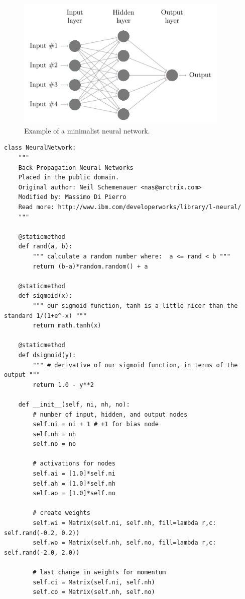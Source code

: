 \documentclass[justified,sixbynine]{tufte-book}
\def\ft{\small\tt}
\theoremstyle{plain}%
\theoremstyle{definition}
\theoremstyle{remark}
\begin{document}
\begin{fullwidth}
\begin{figure}[ht]
\centering\includegraphics[width=4in]{images/neural.png}
\caption{Example of a minimalist neural network.}
\end{figure}


\begin{lstlisting}[caption={in file: {\ft nlib.py}}]
class NeuralNetwork:
    """
    Back-Propagation Neural Networks
    Placed in the public domain.
    Original author: Neil Schemenauer <nas@arctrix.com>
    Modified by: Massimo Di Pierro
    Read more: http://www.ibm.com/developerworks/library/l-neural/
    """

    @staticmethod
    def rand(a, b):
        """ calculate a random number where:  a <= rand < b """
        return (b-a)*random.random() + a

    @staticmethod
    def sigmoid(x):
        """ our sigmoid function, tanh is a little nicer than the standard 1/(1+e^-x) """
        return math.tanh(x)

    @staticmethod
    def dsigmoid(y):
        """ # derivative of our sigmoid function, in terms of the output """
        return 1.0 - y**2

    def __init__(self, ni, nh, no):
        # number of input, hidden, and output nodes
        self.ni = ni + 1 # +1 for bias node
        self.nh = nh
        self.no = no

        # activations for nodes
        self.ai = [1.0]*self.ni
        self.ah = [1.0]*self.nh
        self.ao = [1.0]*self.no

        # create weights
        self.wi = Matrix(self.ni, self.nh, fill=lambda r,c: self.rand(-0.2, 0.2))
        self.wo = Matrix(self.nh, self.no, fill=lambda r,c: self.rand(-2.0, 2.0))

        # last change in weights for momentum
        self.ci = Matrix(self.ni, self.nh)
        self.co = Matrix(self.nh, self.no)


\end{lstlisting}
\end{fullwidth}
\end{document}
